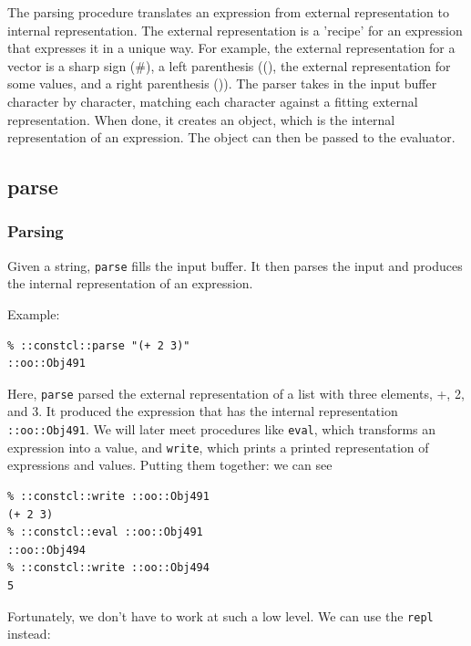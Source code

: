 \documentclass[twoside,9pt]{report}
\begin{document}
The parsing procedure translates an expression from external representation to internal representation. The external representation is a 'recipe' for an expression that expresses it in a unique way. For example, the external representation for a vector is a sharp sign (\#), a left parenthesis ((), the external representation for some values, and a right parenthesis ()). The parser takes in the input buffer character by character, matching each character against a fitting external representation. When done, it creates an object, which is the internal representation of an expression. The object can then be passed to the evaluator.

\subsection{parse}
\label{parse}
\subsubsection{Parsing}
\label{parsing}

Given a string, \texttt{parse} fills the input buffer. It then parses the input and produces the internal representation of an expression.


Example:

\noindent\makebox[\linewidth]{\rule{\linewidth}{0.4pt}}
\begin{lstlisting}
% ::constcl::parse "(+ 2 3)"
::oo::Obj491
\end{lstlisting}
\noindent\makebox[\linewidth]{\rule{\linewidth}{0.4pt}}

Here, \texttt{parse} parsed the external representation of a list with three elements, +, 2, and 3. It produced the expression that has the internal representation \texttt{::oo::Obj491}. We will later meet procedures like \texttt{eval}, which transforms an expression into a value, and \texttt{write}, which prints a printed representation of expressions and values. Putting them together: we can see

\noindent\makebox[\linewidth]{\rule{\linewidth}{0.4pt}}
\begin{lstlisting}
% ::constcl::write ::oo::Obj491
(+ 2 3)
% ::constcl::eval ::oo::Obj491
::oo::Obj494
% ::constcl::write ::oo::Obj494
5
\end{lstlisting}
\noindent\makebox[\linewidth]{\rule{\linewidth}{0.4pt}}

Fortunately, we don't have to work at such a low level. We can use the \texttt{repl} instead:
\end{document}
